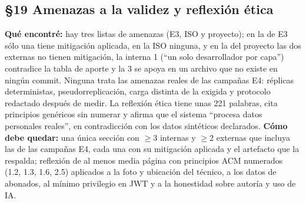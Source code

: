 \subsection*{\S19 Amenazas a la validez y reflexi\'on \'etica}
\textbf{Qu\'e encontr\'e:} hay tres listas de amenazas (E3, ISO y proyecto); en la de E3 s\'olo una tiene mitigaci\'on aplicada, en la ISO ninguna, y en la del proyecto las dos externas no tienen mitigaci\'on, la interna 1 (``un solo desarrollador por capa'') contradice la tabla de aporte y la 3 se apoya en un archivo que no existe en ning\'un commit. Ninguna trata las amenazas reales de las campa\~nas E4: r\'eplicas deterministas, pseudorreplicaci\'on, carga distinta de la exigida y protocolo redactado despu\'es de medir. La reflexi\'on \'etica tiene unas 221 palabras, cita principios gen\'ericos sin numerar y afirma que el sistema ``procesa datos personales reales'', en contradicci\'on con los datos sint\'eticos declarados. \textbf{C\'omo debe quedar:} una \'unica secci\'on con $\ge$3 internas y $\ge$2 externas que incluya las de las campa\~nas E4, cada una con su mitigaci\'on aplicada y el artefacto que la respalda; reflexi\'on de al menos media p\'agina con principios ACM numerados (1.2, 1.3, 1.6, 2.5) aplicados a la foto y ubicaci\'on del t\'ecnico, a los datos de abonados, al m\'inimo privilegio en JWT y a la honestidad sobre autor\'ia y uso de IA.

